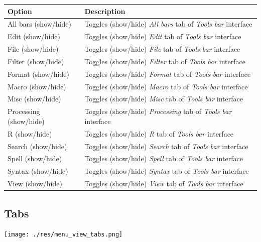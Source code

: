 \begin{scriptsize}\begin{tabularx}{\textwidth}{>{\hsize=0.3\hsize}X>{\hsize=0.7\hsize}X}\\
    \hline
    \textbf{Option} & \textbf{Description} \\
    \hline
    All bars (show/hide) & Toggles (show/hide) \textit{All bars} tab of \textit{Tools bar} interface \\
    Edit (show/hide) & Toggles (show/hide) \textit{Edit} tab of \textit{Tools bar} interface \\
    File (show/hide) & Toggles (show/hide) \textit{File} tab of \textit{Tools bar} interface \\
    Filter (show/hide) & Toggles (show/hide) \textit{Filter} tab of \textit{Tools bar} interface \\
    Format (show/hide) & Toggles (show/hide) \textit{Format} tab of \textit{Tools bar} interface \\
    Macro (show/hide) & Toggles (show/hide) \textit{Macro} tab of \textit{Tools bar} interface \\
    Misc (show/hide) & Toggles (show/hide) \textit{Misc} tab of \textit{Tools bar} interface \\
    Processing (show/hide) & Toggles (show/hide) \textit{Processing} tab of \textit{Tools bar} interface \\
    R (show/hide) & Toggles (show/hide) \textit{R} tab of \textit{Tools bar} interface \\
    Search (show/hide) & Toggles (show/hide) \textit{Search} tab of \textit{Tools bar} interface \\
    Spell (show/hide) & Toggles (show/hide) \textit{Spell} tab of \textit{Tools bar} interface \\
    Syntax (show/hide) & Toggles (show/hide) \textit{Syntax} tab of \textit{Tools bar} interface \\
    View (show/hide) & Toggles (show/hide) \textit{View} tab of \textit{Tools bar} interface \\
    \hline
  \end{tabularx}\end{scriptsize}


\hypertarget{menu_view_tabs}{}
\subsection{Tabs}

\texttt{[image: ./res/menu\_view\_tabs.png]}\\

